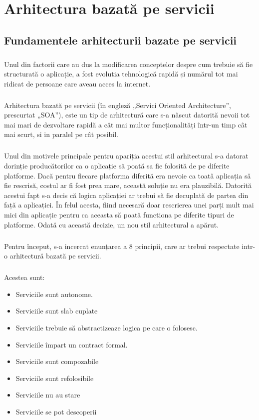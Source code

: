\documentclass[12pt]{report}
\begin{document}
  \chapter{Arhitectura bazată pe servicii}
  	\section{Fundamentele arhitecturii bazate pe servicii}
  	\paragraph{}Unul din factorii care au dus la modificarea conceptelor despre cum trebuie să fie structurată o aplicație, a fost evolutia tehnologică rapidă și numărul tot mai ridicat de persoane care aveau acces la internet.
	\paragraph{}Arhitectura bazată pe servicii (în engleză „Servici Oriented Architecture”, prescurtat „SOA”), este un tip de arhitectură care s-a născut datorită nevoii tot mai mari de dezvoltare rapidă a cât mai multor funcționalități într-un timp cât mai scurt, si in paralel pe cât posibil.
	\paragraph{}Unul din motivele principale pentru apariția acestui stil arhitectural s-a datorat dorinție producătorilor ca o aplicație să poată sa fie folosită de pe diferite platforme. Dacă pentru fiecare platforma diferită era nevoie ca toată aplicația să fie rescrisă, costul ar fi fost prea mare, această soluție nu era plauzibilă. Datorită acestui fapt s-a decis că logica aplicației ar trebui să fie decuplată de partea din față a aplicației. În felul acesta, fiind necesară doar rescrierea  unei parți mult mai mici din aplicație pentru ca aceasta să poată functiona pe diferite tipuri de platforme. Odată cu această decizie, un nou stil arhitectural a apărut.\cite{erl1900service}
	\paragraph{}Pentru început, s-a incercat enunțarea a 8 principii, care ar trebui respectate intr-o arhitectură bazată pe servicii.\cite{erl1}
	\paragraph{}Acestea sunt:
	\begin{itemize}
	\item Serviciile sunt autonome.
	\item Serviciile sunt slab cuplate
	\item Serviciile trebuie să abstractizeaze logica pe care o folosesc.
	\item Serviciile împart un contract formal.
	\item Serviciile sunt compozabile
	\item Serviciile sunt refolosibile
	\item Serviciile nu au stare
	\item Serviciile se pot descoperii
	\end{itemize}
\end{document}
